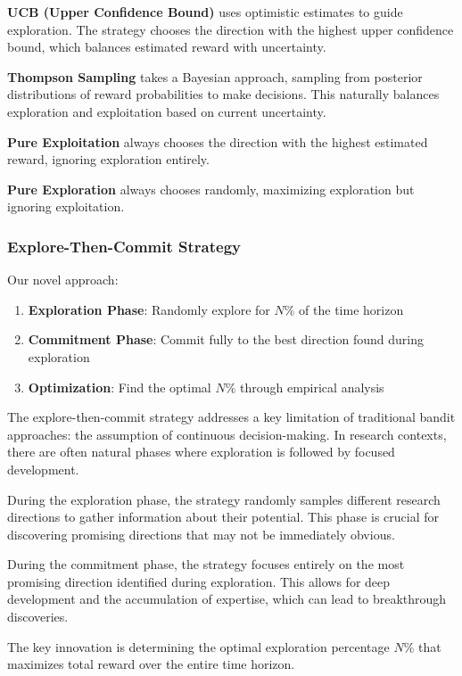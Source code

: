 \documentclass[letterpaper]{article} %
\begin{document}
\textbf{UCB (Upper Confidence Bound)} uses optimistic estimates to guide exploration. The strategy chooses the direction with the highest upper confidence bound, which balances estimated reward with uncertainty.

\textbf{Thompson Sampling} takes a Bayesian approach, sampling from posterior distributions of reward probabilities to make decisions. This naturally balances exploration and exploitation based on current uncertainty.

\textbf{Pure Exploitation} always chooses the direction with the highest estimated reward, ignoring exploration entirely.

\textbf{Pure Exploration} always chooses randomly, maximizing exploration but ignoring exploitation.

\subsubsection{Explore-Then-Commit Strategy}

Our novel approach:
\begin{enumerate}
\item \textbf{Exploration Phase}: Randomly explore for $N\%$ of the time horizon
\item \textbf{Commitment Phase}: Commit fully to the best direction found during exploration
\item \textbf{Optimization}: Find the optimal $N\%$ through empirical analysis
\end{enumerate}

The explore-then-commit strategy addresses a key limitation of traditional bandit approaches: the assumption of continuous decision-making. In research contexts, there are often natural phases where exploration is followed by focused development.

During the exploration phase, the strategy randomly samples different research directions to gather information about their potential. This phase is crucial for discovering promising directions that may not be immediately obvious.

During the commitment phase, the strategy focuses entirely on the most promising direction identified during exploration. This allows for deep development and the accumulation of expertise, which can lead to breakthrough discoveries.

The key innovation is determining the optimal exploration percentage $N\%$ that maximizes total reward over the entire time horizon.
\end{document}
